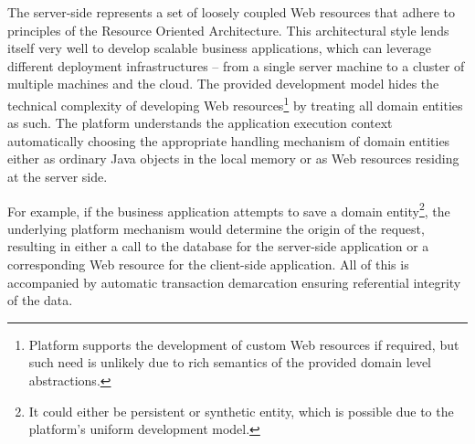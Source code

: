   The server-side represents a set of loosely coupled Web resources that adhere to principles of the Resource Oriented Architecture.
  This architectural style lends itself very well to develop scalable business applications, which can leverage different deployment infrastructures -- from a single server machine to a cluster of multiple machines and the cloud.
  The provided development model hides the technical complexity of developing Web resources\footnote{Platform supports the development of custom Web resources if required, but such need is unlikely due to rich semantics of the provided domain level abstractions.} by treating all domain entities as such.
  The platform understands the application execution context automatically choosing the appropriate handling mechanism of domain entities either as ordinary Java objects in the local memory or as Web resources residing at the server side.
  
  For example, if the business application attempts to save a domain entity\footnote{It could either be persistent or synthetic entity, which is possible due to the platform's uniform development model.}, the underlying platform mechanism would determine the origin of the request, resulting in either a call to the database for the server-side application or a corresponding Web resource for the client-side application.
  All of this is accompanied by automatic transaction demarcation ensuring referential integrity of the data.

